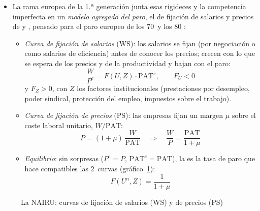 \documentclass[11pt]{article}
\begin{document}
\begin{itemize}
\begin{itemize}
{\begin{itemize}
\item en los contratos implícitos es incompleta pero simétrica (nadie sabe qué estado llegará, pero todos lo ven cuando llega);
\item en los salarios de eficiencia es asimétrica (la empresa no ve el esfuerzo).
\end{itemize}
Con información asimétrica sobre el estado, los contratos implícitos sí pueden dar subempleo\nocite{Azariadis1975Implicit} .}
  \end{itemize}
\item La rama europea de la 1.ª generación junta esas rigideces y la competencia imperfecta en un \emph{modelo agregado del paro}, el de fijación de salarios y precios de \textcite{LayardNickell1985Causes} y \textcite{LayardNickellJackman1991Unemployment}, pensado para el paro europeo de los 70~y los 80 :
  \begin{itemize}
  \item \emph{Curva de fijación de salarios} (WS): los salarios se fijan (por negociación o como salarios de eficiencia) antes de conocer los precios; crecen con lo que se espera de los precios y de la productividad y bajan con el paro:
    \begin{equation}
    \frac{W}{P^e}=F(U,Z)\cdot\mathrm{PAT}^e,\qquad F_U<0 \label{eq:ws}
    \end{equation}
    y $F_Z>0$, con $Z$ los factores institucionales (prestaciones por desempleo, poder sindical, protección del empleo, impuestos sobre el trabajo).
  \item \emph{Curva de fijación de precios} (PS): las empresas fijan un margen $\mu$ sobre el coste laboral unitario, $W/\mathrm{PAT}$:
    \begin{equation}
    P=(1+\mu)\,\frac{W}{\mathrm{PAT}}\quad\Longrightarrow\quad\frac{W}{P}=\frac{\mathrm{PAT}}{1+\mu} \label{eq:ps}
    \end{equation}
  \item \emph{Equilibrio}: sin sorpresas ($P^e=P$, $\mathrm{PAT}^e=\mathrm{PAT}$), la  es la tasa de paro que hace compatibles las 2~curvas (gráfico~\ref{fig:ws-ps}):
    \begin{equation}
    F(U^n,Z)=\frac{1}{1+\mu} \label{eq:nairu}
    \end{equation}
  \end{itemize}
\end{itemize}

\begin{figure}[H]
\centering
\caption{La NAIRU: curvas de fijación de salarios (WS) y de precios (PS)}\label{fig:ws-ps}
\end{figure}
\end{document}
